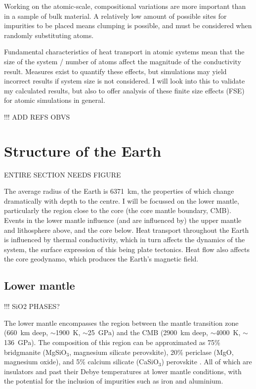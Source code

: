 Working on the atomic-scale, compositional variations are more important than in a sample of bulk material. A relatively low amount of possible sites for impurities to be placed means clumping is possible, and must be considered when randomly substituting atoms.

Fundamental characteristics of heat transport in atomic systems mean that the size of the system / number of atoms affect the magnitude of the conductivity result. Measures exist to quantify these effects, but simulations may yield incorrect results if system size is not considered. I will look into this to validate my calculated results, but also to offer analysis of these finite size effects (FSE) for atomic simulations in general.

!!! ADD REFS OBVS



\section{Structure of the Earth}
\label{sec:earth_structure}

ENTIRE SECTION NEEDS FIGURE 

The average radius of the Earth is 6371~km, the properties of which change dramatically with depth to the centre. I will be focussed on the lower mantle, particularly the region close to the core (the core mantle boundary, CMB). Events in the lower mantle influence (and are influenced by) the upper mantle and lithosphere above, and the core below. Heat transport throughout the Earth is influenced by thermal conductivity, which in turn affects the dynamics of the system, the surface expression of this being plate tectonics. Heat flow also affects the core geodynamo, which produces the Earth's magnetic field. 

\subsection{Lower mantle}

!!! SiO2 PHASES?

The lower mantle encompasses the region between the mantle transition zone (660~km deep, $\sim$1900~K, $\sim$25~GPa) and the CMB (2900~km deep, $\sim$4000~K, $\sim$136~GPa). The composition of this region can be approximated as 75\% bridgmanite (MgSiO$_3$, magnesium silicate perovskite), 20\% periclase (MgO, magnesium oxide), and  5\% calcium silicate (CaSiO$_3$) perovskite \citep{Tronnes2009}. All of which are insulators and past their Debye temperatures at lower mantle conditions, with the potential for the inclusion of impurities such as iron and aluminium.

